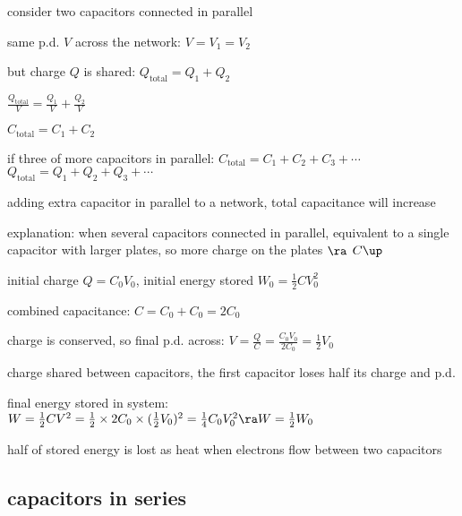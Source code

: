 consider two capacitors connected in parallel

same p.d. $V$ across the network: $V=V_1=V_2$

but charge $Q$ is shared: $Q_\text{total} = Q_1 + Q_2$

{

\centering

$\frac{Q_\text{total}}{V} = \frac{Q_1}{V} + \frac{Q_2}{V}$

$C_\text{total} = C_1 + C_2$

}


if three of more capacitors in parallel: $\boxed{C_\text{total} = C_1 + C_2 + C_3 + \cdots}$ $\quad$ $\boxed{Q_\text{total} = Q_1 + Q_2 + Q_3 + \cdots}$

\cmt adding extra capacitor in parallel to a network, total capacitance will increase

explanation: when several capacitors connected in parallel, equivalent to a single capacitor with larger plates, so more charge on the plates $\ra$ $C\up$


\sol initial charge $Q=C_0 V_0$, initial energy stored $W_0 = \frac{1}{2} C V_0^2$

combined capacitance: $C= C_0 + C_0 = 2C_0$

charge is conserved, so final p.d. across: $V = \frac{Q}{C} = \frac{C_0 V_0}{2C_0} = \frac{1}{2} V_0$


charge shared between capacitors, the first capacitor loses half its charge and p.d.

final energy stored in system: $W = \frac{1}{2}CV^2 = \frac{1}{2} \times 2C_0 \times (\frac{1}{2}V_0)^2 = \frac{1}{4} C_0 V_0^2 \ra W = \frac{1}{2} W_0$

half of stored energy is lost as heat when electrons flow between two capacitors \eoe



\newpage

\subsection{capacitors in series}

